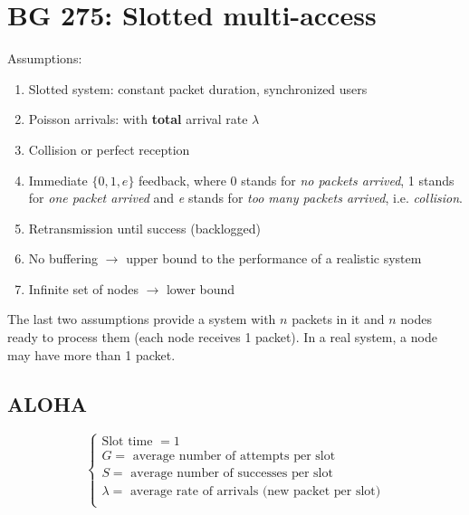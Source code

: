 \section{BG 275: Slotted multi-access}
Assumptions:
\begin{enumerate}
	\item Slotted system: constant packet duration, synchronized users
	\item Poisson arrivals: with \textbf{total} arrival rate $\lambda$
	\item Collision or perfect reception
	\item Immediate $ \{ 0,1, e\}$ feedback, where 0 stands for \textit{no packets arrived}, 1 stands for \textit{one packet arrived} and \textit{e} stands for \textit{too many packets arrived}, i.e. \textit{collision}.
	\item Retransmission until success (backlogged)
	\item No buffering $\rightarrow$ upper bound to the performance of a realistic system
	\item Infinite set of nodes $\rightarrow$ lower bound
\end{enumerate}
The last two assumptions provide a system with $n$ packets in it and $n$ nodes ready to process them (each node receives 1 packet).
In a real system, a node may have more than 1 packet.

\subsection{ALOHA}
\begin{equation*}
	\begin{cases}
		\text{Slot time }= 1 \\
		G = \text{ average number of attempts per slot} \\
		S = \text{ average number of successes per slot} \\
		\lambda = \text{ average rate of arrivals (new packet per slot)} \\
	\end{cases}
\end{equation*}

